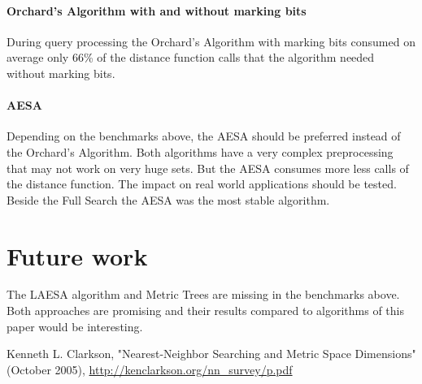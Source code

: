 \documentclass[runningheads,a4paper]{llncs}
\begin{document}
\paragraph{Orchard’s Algorithm with and without marking bits} During query processing the Orchard’s Algorithm with
marking bits consumed on average only 66\% of the distance function calls that the algorithm needed without marking
bits.

\paragraph{AESA} Depending on the benchmarks above, the AESA should be preferred instead of the Orchard’s Algorithm.
Both algorithms have a very complex preprocessing that may not work on very huge sets. But the AESA consumes more less
calls of the distance function. The impact on real world applications should be tested. Beside the Full Search the AESA
was the most stable algorithm.

\section{Future work}

The LAESA algorithm and Metric Trees are missing in the benchmarks above. Both approaches are promising and their
results compared to algorithms of this paper would be interesting.

\begin{thebibliography}{4}
	 Kenneth L. Clarkson, "Nearest-Neighbor Searching and Metric Space Dimensions" (October 2005), \url{http://kenclarkson.org/nn_survey/p.pdf}
\end{thebibliography}
\end{document}
